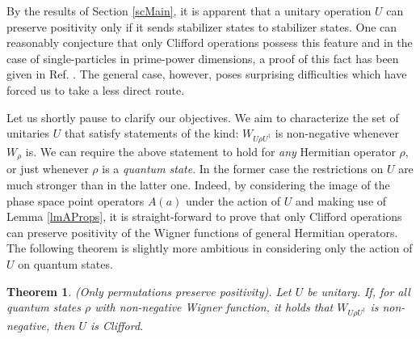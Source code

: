 \documentclass[aps,twocolumn,floatfix]{revtex4}
\newtheorem{theorem}{Theorem}
\begin{document}
By the results of Section \ref{scMain}, it is apparent that a
unitary operation $U$ can preserve positivity only if it sends
stabilizer states to stabilizer states.  One can reasonably conjecture
that only Clifford operations possess this feature and in the case of
single-particles in prime-power dimensions, a proof of this fact has
been given in Ref. \cite{galvao}.  The general case, however, poses
surprising difficulties which have forced us to take a less direct
route.

Let us shortly pause to clarify our objectives. We aim to characterize
the set of unitaries $U$ that satisfy statements of the kind:
$W_{U\rho U^\dagger}$ is non-negative whenever $W_\rho$ is. We can
require the above statement to hold for \emph{any} Hermitian operator
$\rho$, or just whenever $\rho$ is a \emph{quantum state}. In the
former case the restrictions on $U$ are much stronger than in the
latter one. Indeed, by considering the image of the phase space point
operators $A(a)$ under the action of $U$ and making use of Lemma
\ref{lmAProps}, it is straight-forward to prove that only Clifford
operations can preserve positivity of the Wigner functions of general
Hermitian operators. The following theorem is slightly more ambitious
in considering only the action of $U$ on quantum states.

\begin{theorem}
	\label{tmDynamics}
	\emph{(Only permutations preserve positivity).}
	Let $U$ be unitary. If, for all quantum states $\rho$ with non-negative
	Wigner function, it holds that $W_{U\rho U^\dagger}$ is non-negative, then
	$U$ is Clifford.
\end{theorem}
\end{document}
